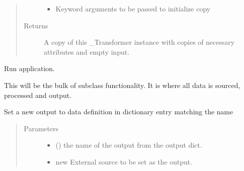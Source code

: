 \documentclass[letterpaper,10pt,english]{sphinxmanual}
\begin{document}
\begin{fulllineitems}
\begin{fulllineitems}
\begin{quote}
\begin{description}
\begin{itemize}
\item {} 
 \textendash{} Keyword arguments to be passed to initialize copy

\end{itemize}

\item[{Returns}] \leavevmode
A copy of this \_Transformer instance with copies of necessary
attributes and empty input.

\end{description}\end{quote}

\end{fulllineitems}


\begin{fulllineitems}
\label{\detokenize{dalio.application:dalio.application.application.Application.run}}
Run application.

This will be the bulk of subclass functionality. It is where all
data is sourced, processed and output.

\end{fulllineitems}


\begin{fulllineitems}
\label{\detokenize{dalio.application:dalio.application.application.Application.set_output}}
Set a new output to data definition in dictionary entry
matching the name
\begin{quote}\begin{description}
\item[{Parameters}] \leavevmode\begin{itemize}
\item {} 
 () \textendash{} the name of the output from the output dict.

\item {} 
 \textendash{} new External source to be set as the output.


\end{itemize}
\end{description}
\end{quote}
\end{fulllineitems}
\end{fulllineitems}
\end{document}
